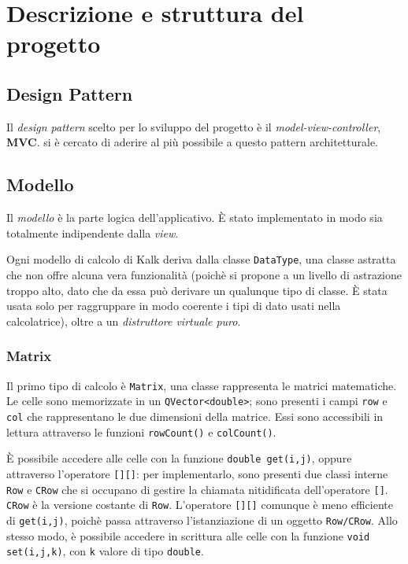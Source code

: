 \section{Descrizione e struttura del progetto}

\subsection{Design Pattern}
Il \emph{design pattern} scelto per lo sviluppo del progetto è il 
\emph{model-view-controller}, \textbf{MVC}. si è cercato di aderire
al più possibile a questo pattern architetturale.

\subsection{Modello}
Il \emph{modello} è la parte logica dell'applicativo. È stato implementato in
modo sia totalmente indipendente dalla \emph{view}. \par
Ogni modello di calcolo di Kalk deriva dalla classe \texttt{DataType}, una classe
astratta che non offre alcuna vera funzionalità (poichè si propone a un livello di astrazione
troppo alto, dato che da essa può derivare un qualunque tipo di classe. È stata usata solo per
raggruppare in modo coerente i tipi di dato usati nella calcolatrice), oltre a un \emph{distruttore %
virtuale puro}.
\subsubsection{Matrix}
Il primo tipo di calcolo è \texttt{Matrix}, una classe rappresenta le matrici matematiche.
Le celle sono memorizzate in un \texttt{QVector<double>}; sono presenti
i campi \texttt{row} e \texttt{col} che rappresentano le due dimensioni della matrice.
Essi sono accessibili in lettura attraverso le funzioni \texttt{rowCount()} e 
\texttt{colCount()}. \par

È possibile accedere alle celle con la funzione \texttt{double get(i,j)}, 
oppure attraverso l'operatore \texttt{[][]}: per implementarlo, sono presenti due classi interne
\texttt{Row} e \texttt{CRow} che si occupano di gestire la chiamata nitidificata dell'operatore 
\texttt{[]}. \texttt{CRow} è la versione costante di \texttt{Row}. L'operatore \texttt{[][]} comunque è meno
efficiente di \texttt{get(i,j)}, poichè passa attraverso l'istanziazione di un oggetto \texttt{Row/CRow}.
Allo stesso modo, è possibile accedere in scrittura alle celle con la funzione \mbox{\texttt{void set(i,j,k)}}, con 
\texttt{k} valore di tipo \texttt{double}.